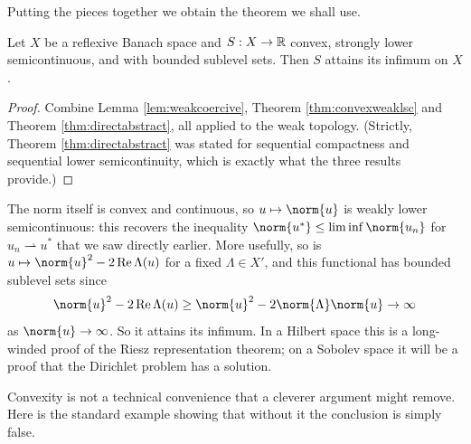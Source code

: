 \documentclass[a4paper]{scrartcl}
\newcommand{\weakto}{\rightharpoonup}
\begin{document}
Putting the pieces together we obtain the theorem we shall use.

\begin{corollary}\label{cor:directconvex}
	Let $X$ be a reflexive Banach space and $S : X \to \mathbb{R}$ convex, strongly lower semicontinuous, and with bounded sublevel sets. Then $S$ attains its infimum on $X$.
\end{corollary}

\begin{proof}
	Combine Lemma \ref{lem:weakcoercive}, Theorem \ref{thm:convexweaklsc} and Theorem \ref{thm:directabstract}, all applied to the weak topology. (Strictly, Theorem \ref{thm:directabstract} was stated for sequential compactness and sequential lower semicontinuity, which is exactly what the three results provide.)
\end{proof}

\begin{example}
	The norm itself is convex and continuous, so $u \mapsto \norm{u}$ is weakly lower semicontinuous: this recovers the inequality $\norm{u^*}\le\liminf\norm{u_n}$ for $u_n \weakto u^*$ that we saw directly earlier. More usefully, so is $u \mapsto \norm{u}^2 - 2\re\Lambda(u)$ for a fixed $\Lambda \in X'$, and this functional has bounded sublevel sets since
	$$\norm{u}^2 - 2\re\Lambda(u) \ge \norm{u}^2 - 2\norm{\Lambda}\norm{u} \to \infty$$
	as $\norm{u}\to\infty$. So it attains its infimum. In a Hilbert space this is a long-winded proof of the Riesz representation theorem; on a Sobolev space it will be a proof that the Dirichlet problem has a solution.
\end{example}

Convexity is not a technical convenience that a cleverer argument might remove. Here is the standard example showing that without it the conclusion is simply false.
\end{document}
